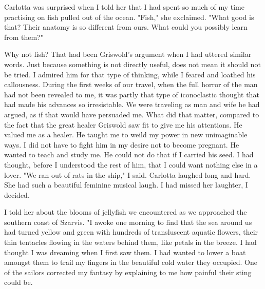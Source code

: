 \documentclass{article}
\begin{document}
Carlotta was surprised when I told her that I had spent so much of my time practising on fish pulled out of the ocean. "Fish," she exclaimed. "What good is that? Their anatomy is so different from ours. What could you possibly learn from them?"

Why not fish? That had been Griswold's argument when I had uttered similar words. Just because something is not directly useful, does not mean it should not be tried. I admired him for that type of thinking, while I feared and loathed his callousness. During the first weeks of our travel, when the full horror of the man had not been revealed to me, it was partly that type of  iconoclastic thought that had made his advances so irresistable. We were traveling as man and wife he had argued, as if that would have persuaded me. What did that matter, compared to the fact that the great healer Griswold saw fit to give me his attentions. He valued me as a healer. He taught me to weild my power in new unimaginable ways. I did not have to fight him in my desire not to become pregnant. He wanted to teach and study me. He could not do that if I carried his seed. I had thought, before I understood the rest of him, that I could want nothing else in a lover. "We ran out of rats in the ship," I said. Carlotta laughed long and hard. She had such a beautiful feminine musical laugh. I had missed her laughter, I decided. 

I told her about the blooms of jellyfish we encountered as we approached the southern coast of Szarvis. "I awoke one morning to find that the sea around us had turned yellow and green with hundreds of transluscent aquatic flowers, their thin tentacles flowing in the waters behind them, like petals in the breeze. I had thought I was dreaming when I first saw them. I had wanted to lower a boat amongst them to trail my fingers in the beautiful cold water they occupied. One of the sailors corrected my fantasy by explaining to me how painful their sting could be. 
\end{document}
